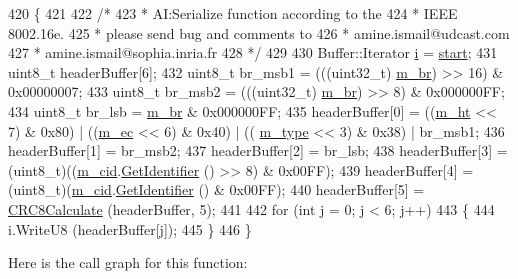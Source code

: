 \begin{DoxyCode}
420 \{
421 
422   \textcolor{comment}{/*}
423 \textcolor{comment}{   * AI:Serialize function according to the}
424 \textcolor{comment}{   * IEEE 8002.16e.}
425 \textcolor{comment}{   * please send bug and comments to}
426 \textcolor{comment}{   * amine.ismail@udcast.com}
427 \textcolor{comment}{   * amine.ismail@sophia.inria.fr}
428 \textcolor{comment}{   */}
429 
430   Buffer::Iterator \hyperlink{bernuolliDistribution_8m_a6f6ccfcf58b31cb6412107d9d5281426}{i} = \hyperlink{namespacevisualizer_1_1core_a2a35e5d8a34af358b508dac8635754e0}{start};
431   uint8\_t headerBuffer[6];
432   uint8\_t br\_msb1 = (((uint32\_t) \hyperlink{classns3_1_1BandwidthRequestHeader_aaf45b47717a872f2cce8d64791d79cc6}{m\_br}) >> 16) & 0x00000007;
433   uint8\_t br\_msb2 = (((uint32\_t) \hyperlink{classns3_1_1BandwidthRequestHeader_aaf45b47717a872f2cce8d64791d79cc6}{m\_br}) >> 8) & 0x000000FF;
434   uint8\_t br\_lsb = \hyperlink{classns3_1_1BandwidthRequestHeader_aaf45b47717a872f2cce8d64791d79cc6}{m\_br} & 0x000000FF;
435   headerBuffer[0] = ((\hyperlink{classns3_1_1BandwidthRequestHeader_aa3c091baf3692d41a367aead455bbe8e}{m\_ht} << 7) & 0x80) | ((\hyperlink{classns3_1_1BandwidthRequestHeader_a015f61b40a1d73ed35d84a9cbe182e86}{m\_ec} << 6) & 0x40) | ((
      \hyperlink{classns3_1_1BandwidthRequestHeader_acbf2b6dc3bfefc47d08cf6edc673ec97}{m\_type} << 3) & 0x38) | br\_msb1;
436   headerBuffer[1] = br\_msb2;
437   headerBuffer[2] = br\_lsb;
438   headerBuffer[3] = (uint8\_t)((\hyperlink{classns3_1_1BandwidthRequestHeader_aea0cd9244c65e015ca03d4139d8cef62}{m\_cid}.\hyperlink{classns3_1_1Cid_a8745a5cf5b7f2e5d142c4fb79072a053}{GetIdentifier} () >> 8) & 0x00FF);
439   headerBuffer[4] = (uint8\_t)(\hyperlink{classns3_1_1BandwidthRequestHeader_aea0cd9244c65e015ca03d4139d8cef62}{m\_cid}.\hyperlink{classns3_1_1Cid_a8745a5cf5b7f2e5d142c4fb79072a053}{GetIdentifier} () & 0x00FF);
440   headerBuffer[5] = \hyperlink{namespacens3_a5329c9897a8f3f61ec901c9d1e61613a}{CRC8Calculate} (headerBuffer, 5);
441 
442   \textcolor{keywordflow}{for} (\textcolor{keywordtype}{int} j = 0; j < 6; j++)
443     \{
444       i.WriteU8 (headerBuffer[j]);
445     \}
446 \}
\end{DoxyCode}


Here is the call graph for this function\+:


